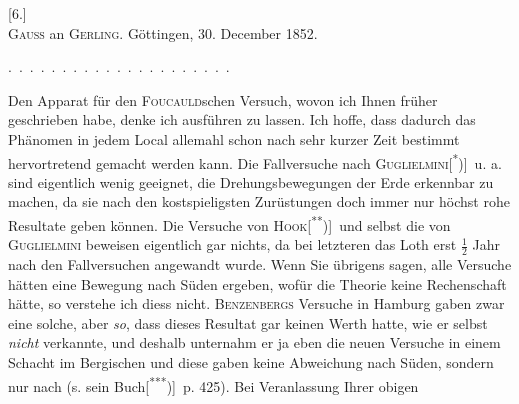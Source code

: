 \clearpage\begingroup{}
\begin{center}
[6.]\\[.7em]
\textsc{Gauss} an \textsc{Gerling}. Göttingen, 30. December 1852.
\end{center}
\noindent .\ .\ .\ .\ .\ .\ .\ .\ .\ .\ .\ .\ .\ .\ .\ .\ .\ .\ .\ .\ .
\par\noindent\hspace*{\parindent}Den Apparat für den \textsc{Foucauld}schen Versuch, wovon ich Ihnen früher
geschrieben habe, denke ich ausführen zu lassen. Ich hoffe, dass dadurch
das Phänomen in jedem Local allemahl schon nach sehr kurzer Zeit bestimmt
hervortretend gemacht werden kann. Die Fallversuche nach \textsc{Guglielmini}[\textsuperscript{*})]\begingroup\renewcommand{\thefootnote}{}\endgroup\
u. a. sind eigentlich wenig geeignet, die Drehungsbewegungen der Erde erkennbar
zu machen, da sie nach den kostspieligsten Zurüstungen doch immer
nur höchst rohe Resultate geben können. Die Versuche von \textsc{Hook}[\textsuperscript{**})]\begingroup\renewcommand{\thefootnote}{}\endgroup\ und
selbst die von \textsc{Guglielmini} beweisen eigentlich gar nichts, da bei letzteren
das Loth erst \(\tfrac{1}{2}\) Jahr nach den Fallversuchen angewandt wurde. Wenn Sie
übrigens sagen, alle Versuche hätten eine Bewegung nach Süden ergeben,
wofür die Theorie keine Rechenschaft hätte, so verstehe ich diess nicht.
\textsc{Benzenbergs} Versuche in Hamburg gaben zwar eine solche, aber \textit{so}, dass
dieses Resultat gar keinen Werth hatte, wie er selbst \textit{nicht} verkannte, und
deshalb unternahm er ja eben die neuen Versuche in einem Schacht im
Bergischen und diese gaben keine Abweichung nach Süden, sondern nur
nach \textls[120]{Norden} (s. sein Buch[\textsuperscript{***})]\begingroup\renewcommand{\thefootnote}{}\endgroup\ p. 425). Bei Veranlassung Ihrer obigen
